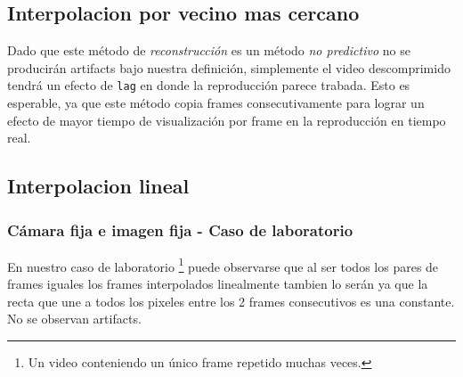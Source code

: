 \subsection{Interpolacion por vecino mas cercano}
Dado que este método de \emph{reconstrucción} es un método \emph{no predictivo} no se producirán artifacts bajo nuestra definición, simplemente el video descomprimido tendrá un efecto de \texttt{lag} en donde la reproducción parece trabada. Esto es esperable, ya que este método copia frames consecutivamente para lograr un efecto de mayor tiempo de visualización por frame en la reproducción en tiempo real. 

\subsection{Interpolacion lineal}
\subsubsection{Cámara fija e imagen fija - Caso de laboratorio}
En nuestro caso de laboratorio \footnote{Un video conteniendo un único frame repetido muchas veces.} puede observarse que al ser todos los pares de frames iguales los frames interpolados linealmente tambien lo serán ya que la recta que une a todos los pixeles entre los 2 frames consecutivos es una constante. No se observan artifacts.